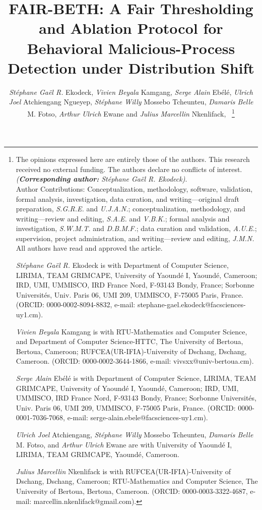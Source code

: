 \documentclass[10pt,journal,compsoc]{IEEEtran}
\begin{document}
\title{FAIR-BETH: A Fair Thresholding and Ablation Protocol for Behavioral Malicious-Process Detection under Distribution Shift}

\author{\emph{St\'{e}phane Ga\"{e}l R.} Ekodeck, \emph{Vivien Beyala} Kamgang, \emph{Serge Alain} Eb\'{e}l\'{e}, \emph{Ulrich Joel} Atchiengang Ngueyep,  \emph{St\'{e}phane Willy} Mossebo Tcheunteu,  \emph{Damaris Belle} M. Fotso,  \emph{Arthur Ulrich} Ewane and \emph{Julius Marcellin} Nkenlifack,~
\thanks{The opinions expressed here are entirely those of the authors. This research received no external funding. The authors declare no conflicts of interest. \emph{(\textbf{Corresponding author:} St\'{e}phane Ga\"{e}l R. Ekodeck)}. \\
Author Contributions: Conceptualization, methodology, software, validation, formal analysis, investigation, data curation, and writing---original draft preparation, \emph{S.G.R.E.} and \emph{U.J.A.N.}; conceptualization, methodology, and writing---review and editing, \emph{S.A.E.} and \emph{V.B.K.}; formal analysis and investigation, \emph{S.W.M.T.} and \emph{D.B.M.F.}; data curation and validation, \emph{A.U.E.}; supervision, project administration, and writing---review and editing, \emph{J.M.N.} All authors have read and approved the article.
\par \emph{St\'{e}phane Ga\"{e}l R.} Ekodeck is with Department of Computer Science, LIRIMA, TEAM GRIMCAPE, University of Yaound\'{e} I, Yaound\'{e}, Cameroon; IRD, UMI, UMMISCO, IRD France Nord, F-93143 Bondy, France; Sorbonne Universit\'{e}s, Univ. Paris 06, UMI 209, UMMISCO, F-75005 Paris, France. (ORCID: 0000-0002-8094-8832, e-mail: stephane-gael.ekodeck@facsciences-uy1.cm).
\par \emph{Vivien Beyala} Kamgang is with RTU-Mathematics and Computer Science, and Department of Computer Science-HTTC, The University of Bertoua, Bertoua, Cameroon; RUFCEA(UR-IFIA)-University of Dschang, Dschang, Cameroon. (ORCID: 0000-0002-3644-1866, e-mail: vivsxx@univ-bertoua.cm).
\par \emph{Serge Alain} Eb\'{e}l\'{e} is with Department of Computer Science, LIRIMA, TEAM GRIMCAPE, University of Yaound\'{e} I, Yaound\'{e}, Cameroon; IRD, UMI, UMMISCO, IRD France Nord, F-93143 Bondy, France; Sorbonne Universit\'{e}s, Univ. Paris 06, UMI 209, UMMISCO, F-75005 Paris, France. (ORCID: 0000-0001-7036-7068, e-mail: serge-alain.ebele@facsciences-uy1.cm).
\par \emph{Ulrich Joel} Atchiengang, \emph{St\'{e}phane Willy} Mossebo Tcheunteu, \emph{Damaris Belle} M. Fotso, and \emph{Arthur Ulrich} Ewane are with University of Yaound\'{e} I, LIRIMA, TEAM GRIMCAPE, Yaound\'{e}, Cameroon.
\par \emph{Julius Marcellin} Nkenlifack is with RUFCEA(UR-IFIA)-University of Dschang, Dschang, Cameroon; RTU-Mathematics and Computer Science, The University of Bertoua, Bertoua, Cameroon. (ORCID: 0000-0003-3322-4687, e-mail: marcellin.nkenlifack@gmail.com).}}
\end{document}
